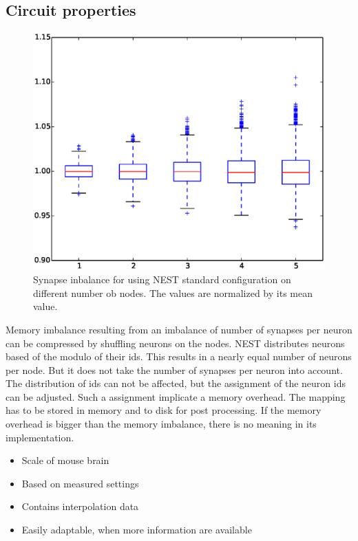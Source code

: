 \documentclass[a4paper]{article}
\begin{document}
\subsection{Circuit properties}

\begin{figure}[ht!]
\centering
\includegraphics[scale=0.4]{full_circuit_rack_distribution.eps}
\caption{Synapse inbalance for using NEST standard configuration on different number ob nodes. The values are normalized by its mean value.}
\end{figure}

Memory imbalance resulting from an imbalance of number of synapses per neuron can be compressed by shuffling neurons on the nodes.
NEST distributes neurons based of the modulo of their ids. This results in a nearly equal number of neurons per node.
But it does not take the number of synapses per neuron into account. The distribution of ids can not be affected, but the assignment of the
neuron ids can be adjusted. Such a assignment implicate a memory overhead. The mapping has to be stored in memory and to disk for post processing.
If the memory overhead is bigger than the memory imbalance, there is no meaning in its implementation.

\begin{itemize}
      \item Scale of mouse brain
      \item Based on measured settings
      \item Contains interpolation data
      \item Easily adaptable, when more information are available
\end{itemize}
\end{document}

